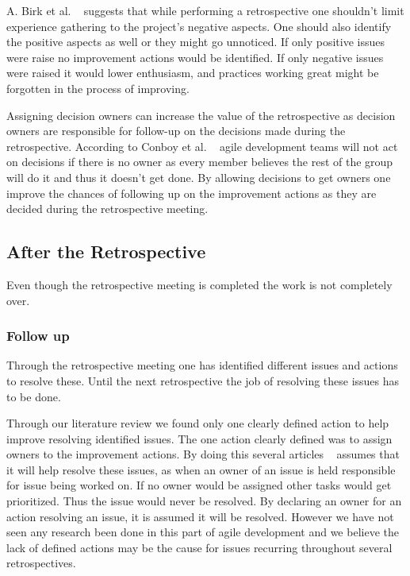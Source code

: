 \documentclass[12pt]{article}
\begin{document}
A. Birk et al. ~\cite{Birk2002} suggests that while performing a retrospective one shouldn't limit experience gathering to the project's negative aspects. One should also identify the positive aspects as well or they might go unnoticed. If only positive issues were raise no improvement actions would be identified. If only negative issues were raised it would lower enthusiasm, and practices working great might be forgotten in the process of improving. 

\label{par:assign-decision-owners} Assigning decision owners can increase the value of the retrospective as decision owners are responsible for follow-up on the decisions made during the retrospective. According to Conboy et al. ~\cite{Drury2012} agile development teams will not act on decisions if there is no owner as every member believes the rest of the group will do it and thus it doesn't get done. By allowing decisions to get owners one improve the chances of following up on the improvement actions as they are decided during the retrospective meeting. 

\subsection{After the Retrospective}
Even though the retrospective meeting is completed the work is not completely over. 

\subsubsection{Follow up}
Through the retrospective meeting one has identified different issues and actions to resolve these. Until the next retrospective the job of resolving these issues has to be done. 

Through our literature review we found only one clearly defined action to help improve resolving identified issues. The one action clearly defined was to assign owners to the improvement actions. By doing this several articles ~\cite{Collier1996,Drury2012} assumes that it will help resolve these issues, as when an owner of an issue is held responsible for issue being worked on. If no owner would be assigned other tasks would get prioritized. Thus the issue would never be resolved. By declaring an owner for an action resolving an issue, it is assumed it will be resolved. However we have not seen any research been done in this part of agile development and we believe the lack of defined actions may be the cause for issues recurring throughout several retrospectives. 
\end{document}
